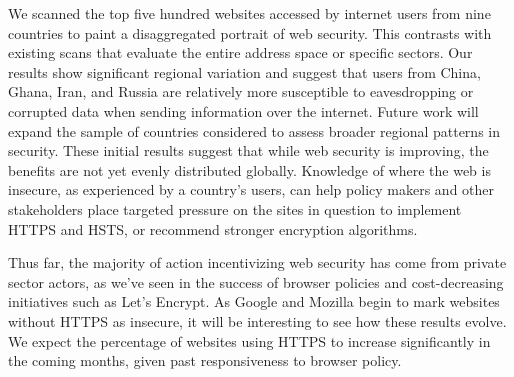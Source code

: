 \documentclass{easychair}
\begin{document}
We scanned the top five hundred websites accessed by internet users from
nine countries to paint a disaggregated portrait of web security. This 
contrasts with existing scans that evaluate the entire address space or 
specific sectors. Our results show significant regional variation and 
suggest that users from China, Ghana, Iran, and Russia are relatively 
more susceptible to eavesdropping or corrupted data when sending 
information over the internet. Future work will expand the sample of 
countries considered to assess broader regional patterns in security. 
These initial results suggest that while web security is improving, the 
benefits are not yet evenly distributed globally. Knowledge of where the
web is insecure, as experienced by a country's users, can help policy 
makers and other stakeholders place targeted pressure on the sites in 
question to implement HTTPS and HSTS, or recommend stronger encryption 
algorithms. 

Thus far, the majority of action incentivizing web security has come 
from private sector actors, as we've seen in the success of browser 
policies and cost-decreasing initiatives such as Let's Encrypt. As 
Google and Mozilla begin to mark websites without HTTPS as insecure, it 
will be interesting to see how these results evolve. We expect the 
percentage of websites using HTTPS to increase significantly in the 
coming months, given past responsiveness to browser policy. 



\end{document}
